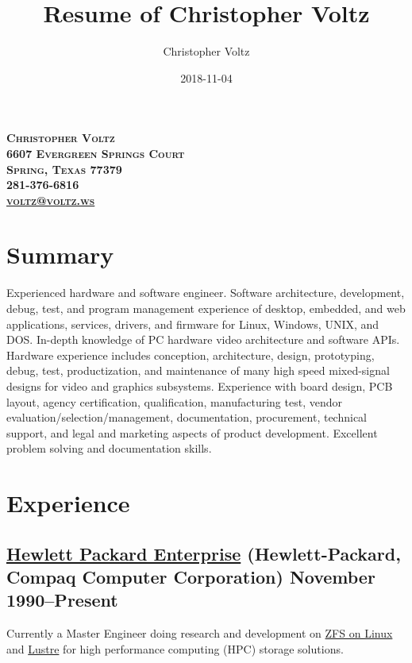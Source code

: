 \documentclass[10pt,letterpaper,oneside]{report}
\title{Resume of Christopher Voltz}
\author{Christopher Voltz}
\date{2018-11-04}
\begin{document}
\begin{center}
  \textbf{
    \textsc{
      Christopher Voltz\\
      6607 Evergreen Springs Court\\
      Spring, Texas 77379\\
      281-376-6816\\
      \href{mailto:voltz@voltz.ws?subject=Resume}{voltz@voltz.ws}
    }
  }
\end{center}

\section{Summary}

Experienced hardware and software engineer. Software architecture, development,
debug, test, and program management experience of desktop, embedded, and web
applications, services, drivers, and firmware for Linux, Windows, UNIX, and DOS.
In-depth knowledge of PC hardware video architecture and software APIs.
Hardware experience includes conception, architecture, design, prototyping,
debug, test, productization, and maintenance of many high speed mixed-signal
designs for video and graphics subsystems. Experience with board design, PCB
layout, agency certification, qualification, manufacturing test, vendor
evaluation/selection/management, documentation, procurement, technical support,
and legal and marketing aspects of product development. Excellent problem
solving and documentation skills.

\section{Experience}

\subsection[Hewlett Packard Enterprise]{
  \href{http://www.hpe.com/}{Hewlett Packard Enterprise}
  {\footnotesize (Hewlett-Packard, Compaq Computer Corporation)}
  \hfill
  November 1990--Present
}

\vspace{-1.5ex}

Currently a Master Engineer doing research and development on
{\href{https://zfsonlinux.org/}{ZFS on Linux}} and
{\href{http://lustre.org/}{Lustre}} for high performance
computing (HPC) storage solutions.
\end{document}

